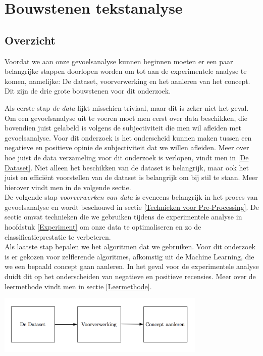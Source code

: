 \chapter{Bouwstenen tekstanalyse}\label{Lectuur}

\section{Overzicht}\label{Overzicht}

Voordat we aan onze gevoelsanalyse kunnen beginnen moeten er een paar belangrijke stappen doorlopen worden om tot aan de experimentele analyse te komen, namelijke: De dataset, voorverwerking en het aanleren van het concept. Dit zijn de drie grote bouwstenen voor dit onderzoek.

Als eerste stap \textit{de data} lijkt misschien triviaal, maar dit is zeker niet het geval. Om een gevoelsanalyse uit te voeren moet men eerst over data beschikken, die bovendien juist gelabeld is volgens de subjectiviteit die men wil afleiden met gevoelsanalyse. Voor dit onderzoek is het onderscheid kunnen maken tussen een negatieve en positieve opinie de subjectiviteit dat we willen afleiden. Meer over hoe juist de data verzameling voor dit onderzoek is verlopen, vindt men in \ref{De Dataset}. Niet alleen het beschikken van de dataset is belangrijk, maar ook het juist en effici\"ent voorstellen van de dataset is belangrijk om bij stil te staan. Meer hierover vindt men in de volgende sectie.\\

De volgende stap \textit{voorverwerken van data}  is eveneens belangrijk in het proces van gevoelsanalyse en wordt beschouwd in sectie \ref{Technieken voor Pre-Processing}. De sectie omvat technieken die we gebruiken tijdens de experimentele analyse in hoofdstuk \ref{Experiment} om onze data te optimaliseren en zo de classificatieprestatie te verbeteren.\\

Als laatste stap bepalen we het algoritmen dat we gebruiken. Voor dit onderzoek is  er gekozen voor zelflerende algoritmes, afkomstig uit de Machine Learning, die we een bepaald concept gaan aanleren. In het geval voor de experimentele analyse duidt dit op het onderscheiden van negatieve en positieve recensies. Meer over de leermethode vindt men in sectie \ref{Leermethode}.

\begin{center}
  \includegraphics[width=10cm]{overzicht}
  \label{fig:beslissingsboom}
\end{center}

